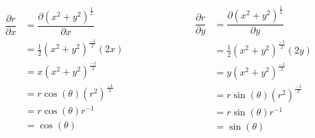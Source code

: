 \documentclass[12pt, fleqn]{report}                             %
\DeclareMathOperator \Space {\quad}                             %
\newcommand{\Wrap}[1]{\left( #1 \right)}                        %
\newcommand{\Cos}[1]{\cos\Wrap{#1}}                             %
\newcommand{\Sin}[1]{\sin\Wrap{#1}}                             %
\newcommand \Partial[2] {\dfrac{\partial #1}{\partial #2}}      %
\begin{document}
                    \begin{equation*}
                        \begin{split}
                            \Partial{r}{x}
                                &= \Partial{\Wrap{x^2 + y^2}^{\frac{1}{2}}}{x}      \\
                                &= \frac{1}{2}\Wrap{x^2 + y^2}^{\frac{-1}{2}}(2x)   \\ 
                                &= x \Wrap{x^2 + y^2}^{\frac{-1}{2}}                \\
                                &= r\Cos{\theta} \Wrap{r^2}^{\frac{-1}{2}}          \\
                                &= r\Cos{\theta} r^{-1}                             \\
                                &= \Cos{\theta}     
                        \end{split}
                        \Space\Space
                        \Space\Space
                        \begin{split}
                            \Partial{r}{y}
                                &= \Partial{\Wrap{x^2 + y^2}^{\frac{1}{2}}}{y}      \\
                                &= \frac{1}{2}\Wrap{x^2 + y^2}^{\frac{-1}{2}}(2y)   \\
                                &= y \Wrap{x^2 + y^2}^{\frac{-1}{2}}                \\
                                &= r\Sin{\theta} \Wrap{r^2}^{\frac{-1}{2}}          \\
                                &= r\Sin{\theta} r^{-1}                             \\
                                &= \Sin{\theta}                                     
                        \end{split}
                    \end{equation*}
\end{document}
